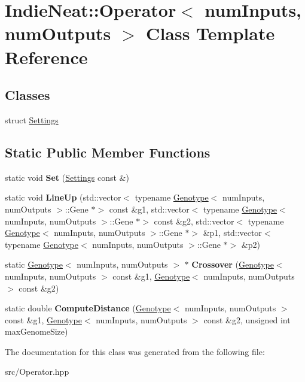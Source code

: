 \hypertarget{class_indie_neat_1_1_operator}{}\section{Indie\+Neat\+:\+:Operator$<$ num\+Inputs, num\+Outputs $>$ Class Template Reference}
\label{class_indie_neat_1_1_operator}
\subsection*{Classes}
\begin{DoxyCompactItemize}
\item 
struct \hyperlink{struct_indie_neat_1_1_operator_1_1_settings}{Settings}
\end{DoxyCompactItemize}
\subsection*{Static Public Member Functions}
\begin{DoxyCompactItemize}
\item 
\mbox{\label{class_indie_neat_1_1_operator_a3906c464cb3fe586ac8d0cbdcb8d57a8}} 
static void {\bfseries Set} (\hyperlink{struct_indie_neat_1_1_operator_1_1_settings}{Settings} const \&)
\item 
\mbox{\label{class_indie_neat_1_1_operator_ad509f15148687f615db47089c89040a7}} 
static void {\bfseries Line\+Up} (std\+::vector$<$ typename \hyperlink{class_indie_neat_1_1_genotype}{Genotype}$<$ num\+Inputs, num\+Outputs $>$\+::Gene $\ast$$>$ const \&g1, std\+::vector$<$ typename \hyperlink{class_indie_neat_1_1_genotype}{Genotype}$<$ num\+Inputs, num\+Outputs $>$\+::Gene $\ast$$>$ const \&g2, std\+::vector$<$ typename \hyperlink{class_indie_neat_1_1_genotype}{Genotype}$<$ num\+Inputs, num\+Outputs $>$\+::Gene $\ast$$>$ \&p1, std\+::vector$<$ typename \hyperlink{class_indie_neat_1_1_genotype}{Genotype}$<$ num\+Inputs, num\+Outputs $>$\+::Gene $\ast$$>$ \&p2)
\item 
\mbox{\label{class_indie_neat_1_1_operator_a82837d3db032d7817d0a09ef6616d88c}} 
static \hyperlink{class_indie_neat_1_1_genotype}{Genotype}$<$ num\+Inputs, num\+Outputs $>$ $\ast$ {\bfseries Crossover} (\hyperlink{class_indie_neat_1_1_genotype}{Genotype}$<$ num\+Inputs, num\+Outputs $>$ const \&g1, \hyperlink{class_indie_neat_1_1_genotype}{Genotype}$<$ num\+Inputs, num\+Outputs $>$ const \&g2)
\item 
\mbox{\label{class_indie_neat_1_1_operator_a1d919a95458ce37d7be2b0231785d4dd}} 
static double {\bfseries Compute\+Distance} (\hyperlink{class_indie_neat_1_1_genotype}{Genotype}$<$ num\+Inputs, num\+Outputs $>$ const \&g1, \hyperlink{class_indie_neat_1_1_genotype}{Genotype}$<$ num\+Inputs, num\+Outputs $>$ const \&g2, unsigned int max\+Genome\+Size)
\end{DoxyCompactItemize}


The documentation for this class was generated from the following file\+:\begin{DoxyCompactItemize}
\item 
src/Operator.\+hpp\end{DoxyCompactItemize}
